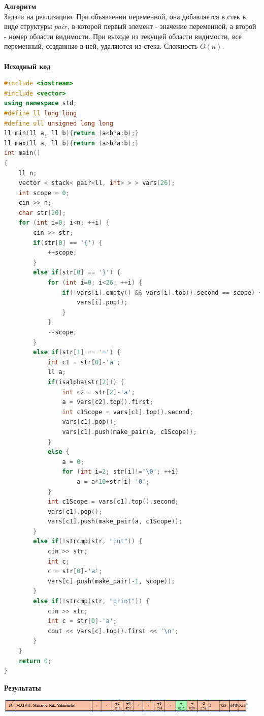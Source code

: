 \documentclass[a4paper,12pt]{article}
\begin{document}
\textbf{{\large Алгоритм}} \\
Задача на реализацию. При объявлении переменной, она добавляется в стек в виде структуры $pair$, в которой первый элемент - значение переменной, а второй - номер области видимости. При выходе из текущей области видимости, все переменный, созданные в ней, удаляются из стека. Сложность $O(n)$. \\ 
\\
\textbf{{\large Исходный код}}
\begin{lstlisting}[language=C++]
#include <iostream>
#include <vector>
using namespace std;
#define ll long long
#define ull unsigned long long
ll min(ll a, ll b){return (a<b?a:b);}
ll max(ll a, ll b){return (a>b?a:b);}
int main()
{
    ll n;
    vector < stack< pair<ll, int> > > vars(26);
    int scope = 0;
    cin >> n;
    char str[20];
    for (int i=0; i<n; ++i) {
        cin >> str;
        if(str[0] == '{') {
            ++scope;
        }
        else if(str[0] == '}') {
            for (int i=0; i<26; ++i) {
                if(!vars[i].empty() && vars[i].top().second == scope) {
                    vars[i].pop();
                }
            }
            --scope;
        }
        else if(str[1] == '=') {
            int c1 = str[0]-'a';
            ll a;
            if(isalpha(str[2])) {
                int c2 = str[2]-'a';
                a = vars[c2].top().first;
                int c1Scope = vars[c1].top().second;
                vars[c1].pop();
                vars[c1].push(make_pair(a, c1Scope));
            }
            else {
                a = 0;
                for (int i=2; str[i]!='\0'; ++i)
                    a = a*10+str[i]-'0';
            }
            int c1Scope = vars[c1].top().second;
            vars[c1].pop();
            vars[c1].push(make_pair(a, c1Scope));
        }
        else if(!strcmp(str, "int")) {
            cin >> str;
            int c;
            c = str[0]-'a';
            vars[c].push(make_pair(-1, scope));
        }
        else if(!strcmp(str, "print")) {
            cin >> str;
            int c = str[0]-'a';
            cout << vars[c].top().first << '\n';
        }
    }
    return 0;
}
\end{lstlisting}

\textbf{{\large Результаты}} \\
\begin{center}
\includegraphics[width=0.95\textwidth]{OC_Europe/OC_Europe_result.png}\\ [1cm]
\end{center}
\end{document}
